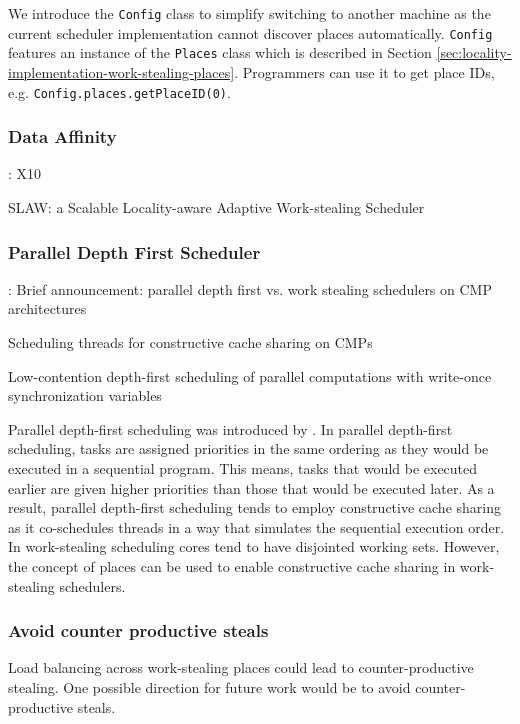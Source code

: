 We introduce the \lstinline!Config! class to simplify switching to
another machine as the current scheduler implementation cannot
discover places automatically. \lstinline!Config! features an instance
of the \lstinline!Places! class which is described in Section
\ref{sec:locality-implementation-work-stealing-places}. Programmers
can use it to get place IDs,
e.g. \lstinline!Config.places.getPlaceID(0)!.

\subsubsection{Data Affinity}

\textcite{Charles2005, Saraswat2010}: X10

\textcite{Guo2010} SLAW: a Scalable Locality-aware Adaptive
Work-stealing Scheduler

\subsubsection{Parallel Depth First Scheduler}

\textcite{Liaskovitis2006}: Brief announcement: parallel depth first
vs. work stealing schedulers on CMP architectures

\textcite{Chen2007} Scheduling threads for constructive cache sharing
on CMPs

\textcite{Fatourou2001} Low-contention depth-first scheduling of
parallel computations with write-once synchronization variables

Parallel depth-first scheduling was introduced by
\textcite{Blelloch1999}. In parallel depth-first scheduling, tasks are
assigned priorities in the same ordering as they would be executed in
a sequential program. This means, tasks that would be executed earlier
are given higher priorities than those that would be executed
later. As a result, parallel depth-first scheduling tends to employ
constructive cache sharing \cite{Liaskovitis2006, Chen2007} as it
co-schedules threads in a way that simulates the sequential execution
order. In work-stealing scheduling cores tend to have disjointed
working sets. However, the concept of places can be used to enable
constructive cache sharing in work-stealing schedulers.

\subsubsection{Avoid counter productive steals}

Load balancing across work-stealing places could lead to
counter-productive stealing. One possible direction for future work
would be to avoid counter-productive steals.

